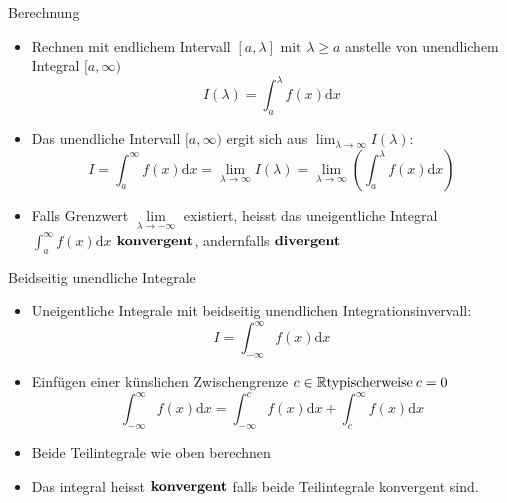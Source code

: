 \begin{KR}{Berechnung}
\begin{itemize}
	\item Rechnen mit endlichem Intervall \([a,\lambda] \text{ mit } \lambda \ge a \) anstelle von unendlichem
		Integral \([a,\infty) \)
		\[I(\lambda)=\int_a^{\lambda}{f(x)\mathrm{d}x} \]
	\item Das unendliche Intervall \([a,\infty) \) ergit sich aus \(\lim_{\lambda \rightarrow
		\infty}I(\lambda) \):
		\[I=\int_a^{\infty}{f(x)\mathrm{d}x}=\underset{\lambda \rightarrow \infty}{\lim}I(\lambda)=
		\underset{\lambda \rightarrow \infty}{\lim}(\int_a^{\lambda}{f(x)\mathrm{d}x}) \]
    \item Falls Grenzwert \(\underset{\lambda \rightarrow -\infty}{\lim}\) existiert, heisst das uneigentliche
        Integral \(\displaystyle\int_{a}^\infty {f(x)\mathrm{d}x}\) \(\bold{konvergent}\), andernfalls 
        \(\bold{divergent}\)
\end{itemize}
\end{KR}


\begin{KR}{Beidseitig unendliche Integrale}
\begin{itemize}
	\item Uneigentliche Integrale mit beidseitig unendlichen Integrationsinvervall:
		\[I=\int_{-\infty}^{\infty}{f(x)\mathrm{d}x}\]
	\item Einfügen einer künslichen Zwischengrenze \(c \in \mathbb{R}\\\text{typischerweise}\:c=0 \)
		\[\int_{-\infty}^{\infty}{f(x)\mathrm{d}x}=\int_{-\infty}^{c}{f(x)\mathrm{d}x}+\int_c^{\infty}
		{f(x)\mathrm{d}x} \]
	\item Beide Teilintegrale wie oben berechnen
	\item Das integral heisst \(\bold{konvergent}\) falls beide Teilintegrale konvergent sind.
\end{itemize}
\end{KR}

